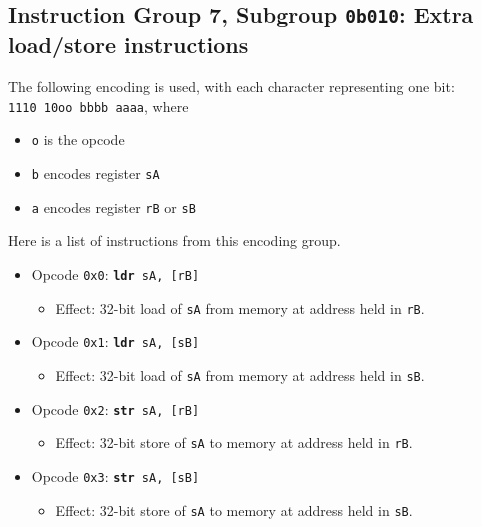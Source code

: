 \documentclass{article}
\begin{document}
	\doublespacing

	\subsection{Instruction Group 7, Subgroup \texttt{0b010}:
		Extra load/store instructions}
	The following encoding is used, with each character representing one
	bit: \\
	\texttt{1110 10oo bbbb aaaa}, where

	\singlespacing
	\begin{itemize}
	\item \texttt{o} is the opcode
	\item \texttt{b} encodes register \texttt{sA}
	\item \texttt{a} encodes register \texttt{rB} or \texttt{sB}
	\end{itemize}
	\doublespacing

	Here is a list of instructions from this encoding group.

	\singlespacing
	\begin{itemize}
	\item Opcode \texttt{0x0}:
		\texttt{\textbf{ldr} sA, [rB]}
		\begin{itemize}
		\item Effect: 32-bit load of \texttt{sA} from memory at address
			held in \texttt{rB}.
		\end{itemize}
	\item Opcode \texttt{0x1}:
		\texttt{\textbf{ldr} sA, [sB]}
		\begin{itemize}
		\item Effect: 32-bit load of \texttt{sA} from memory at address
			held in \texttt{sB}.
		\end{itemize}
	\item Opcode \texttt{0x2}:
		\texttt{\textbf{str} sA, [rB]}
		\begin{itemize}
		\item Effect: 32-bit store of \texttt{sA} to memory at address
			held in \texttt{rB}.
		\end{itemize}
	\item Opcode \texttt{0x3}:
		\texttt{\textbf{str} sA, [sB]}
		\begin{itemize}
		\item Effect: 32-bit store of \texttt{sA} to memory at address
			held in \texttt{sB}.
		\end{itemize}
	\end{itemize}


\end{document}
